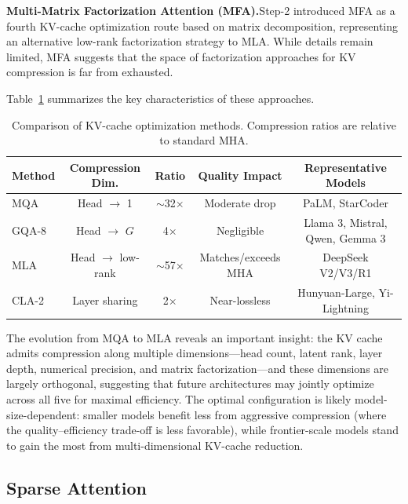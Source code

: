 \textbf{Multi-Matrix Factorization Attention (MFA).}\quad Step-2 introduced MFA as a fourth KV-cache optimization route based on matrix decomposition, representing an alternative low-rank factorization strategy to MLA. While details remain limited, MFA suggests that the space of factorization approaches for KV compression is far from exhausted.

Table~\ref{tab:kv-cache-comparison} summarizes the key characteristics of these approaches.

\begin{table}[t]
\centering
\caption{Comparison of KV-cache optimization methods. Compression ratios are relative to standard MHA.}
\label{tab:kv-cache-comparison}
\small
\begin{tabular}{lcccc}
\toprule
\textbf{Method} & \textbf{Compression Dim.} & \textbf{Ratio} & \textbf{Quality Impact} & \textbf{Representative Models} \\
\midrule
MQA  & Head $\to$ 1    & $\sim$32$\times$  & Moderate drop    & PaLM, StarCoder \\
GQA-8 & Head $\to$ $G$  & 4$\times$         & Negligible       & Llama 3, Mistral, Qwen, Gemma 3 \\
MLA  & Head $\to$ low-rank & $\sim$57$\times$ & Matches/exceeds MHA & DeepSeek V2/V3/R1 \\
CLA-2 & Layer sharing   & 2$\times$         & Near-lossless    & Hunyuan-Large, Yi-Lightning \\
\bottomrule
\end{tabular}
\end{table}

The evolution from MQA to MLA reveals an important insight: the KV cache admits compression along multiple dimensions---head count, latent rank, layer depth, numerical precision, and matrix factorization---and these dimensions are largely orthogonal, suggesting that future architectures may jointly optimize across all five for maximal efficiency. The optimal configuration is likely model-size-dependent: smaller models benefit less from aggressive compression (where the quality--efficiency trade-off is less favorable), while frontier-scale models stand to gain the most from multi-dimensional KV-cache reduction.



\subsection{Sparse Attention}
\label{subsec:sparse-attn}

